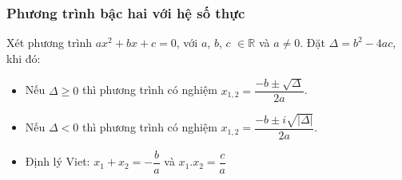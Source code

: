 \begin{tomtat}
\subsubsection {Phương trình bậc hai với hệ số thực}
\begin{boxdl}
Xét phương trình $ax^2+bx+c=0$, với $a$, $b$, $c$ $\in \mathbb{R}$ và $a\ne 0$. Đặt $\Delta =b^2 - 4ac$, khi đó:
\begin{itemize}
	\item Nếu $\Delta \ge 0$ thì phương trình có nghiệm $x_{1,2}=\dfrac{- b\pm \sqrt{\Delta}}{2a}$.
	\item Nếu $\Delta <0$ thì phương trình có nghiệm $x_{1,2}=\dfrac{- b\pm i\sqrt{\left|\Delta\right|}}{2a}$.
	\item Định lý Viet: $x_1+x_2=-\dfrac{b}{a}$ và $x_1.x_2=\dfrac{c}{a}$
\end{itemize}
\end{boxdl}
\end{tomtat}

